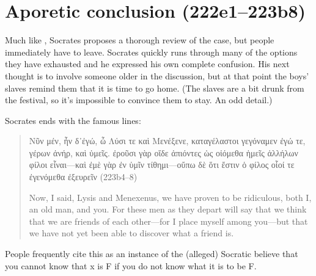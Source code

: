 \documentclass[11pt]{article}
\begin{document}
\section{Aporetic conclusion (222e1--223b8)}

Much like , Socrates proposes a thorough review of the case, but people immediately have to leave.  Socrates quickly runs through many of the options they have exhausted and he expressed his own complete confusion.  His next thought is to involve someone older in the discussion, but at that point the boys' slaves remind them that it is time to go home.  (The slaves are a bit drunk from the festival, so it's impossible to convince them to stay.  An odd detail.)

Socrates ends with the famous lines:

\begin{quote}
    Νῦν μέν, ἦν δ᾽ἐγώ, ὦ Λύσι τε καὶ Μενέξενε, καταγέλαστοι γεγόναμεν ἐγώ τε, γέρων ἀνήρ, καὶ ὑμεῖς.  ἐροῦσι γὰρ οἵδε ἀπιόντες ὡς οἰόμεθα ἡμεῖς ἀλλήλων φίλοι εἶναι---καὶ ἐμὲ γὰρ ἐν ὑμῖν τίθημι---οὔπω δὲ ὅτι ἔστιν ὁ φίλος οἷοί τε ἐγενόμεθα ἐξευρεῖν (223b4--8)

    Now, I said, Lysis and Menexenus, we have proven to be ridiculous, both I, an old man, and you.  For these men as they depart will say that we think that we are friends of each other---for I place myself among you---but that we have not yet been able to discover what a friend is.
\end{quote}

People frequently cite this as an instance of the (alleged) Socratic believe that you cannot know that x is F if you do not know what it is to be F.


\newpage


\end{document}
